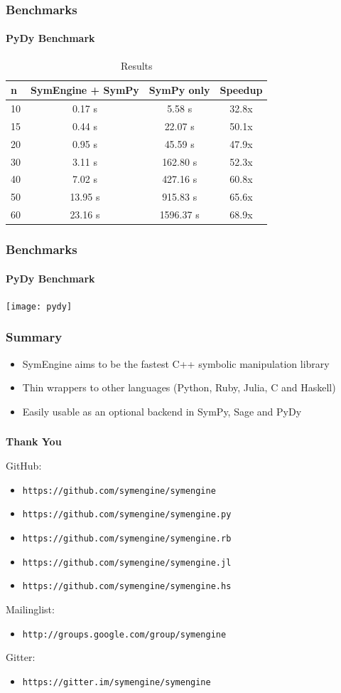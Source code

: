 \documentclass{beamer}
\begin{document}
\begin{frame}
\frametitle{Benchmarks}
\framesubtitle{PyDy Benchmark}
\begin{table}
\begin{tabular}{l | c | c | c  }
n & SymEngine + SymPy & SymPy only & Speedup\\
\hline \hline
10 & 0.17 s & 5.58 s & 32.8x \\
15 & 0.44 s & 22.07 s & 50.1x \\
20 & 0.95 s & 45.59 s & 47.9x \\
30 & 3.11 s & 162.80 s & 52.3x \\
40 & 7.02 s & 427.16 s & 60.8x \\
50 & 13.95 s & 915.83 s & 65.6x \\
60 & 23.16 s & 1596.37 s & 68.9x
\end{tabular}
\caption{Results}
\end{table}
\end{frame}


\begin{frame}
\frametitle{Benchmarks}
\framesubtitle{PyDy Benchmark}
\texttt{[image: pydy]}
\end{frame}


\begin{frame}
\frametitle{Summary}
\begin{itemize}
 \item SymEngine aims to be the fastest C++ symbolic manipulation library
 \item Thin wrappers to other languages (Python, Ruby, Julia, C and Haskell)
 \item Easily usable as an optional backend in SymPy, Sage and PyDy
\end{itemize}
\end{frame}


\begin{frame}
\frametitle{}
{\Large\bf Thank You}
\medskip

GitHub:
\begin{itemize}
\item \texttt{https://github.com/symengine/symengine}
\item \texttt{https://github.com/symengine/symengine.py}
\item \texttt{https://github.com/symengine/symengine.rb}
\item \texttt{https://github.com/symengine/symengine.jl}
\item \texttt{https://github.com/symengine/symengine.hs}
\end{itemize}
Mailinglist:
\begin{itemize}
\item \texttt{http://groups.google.com/group/symengine}
\end{itemize}
Gitter:
\begin{itemize}
\item \texttt{https://gitter.im/symengine/symengine}
\end{itemize}
\end{frame}
\end{document}
